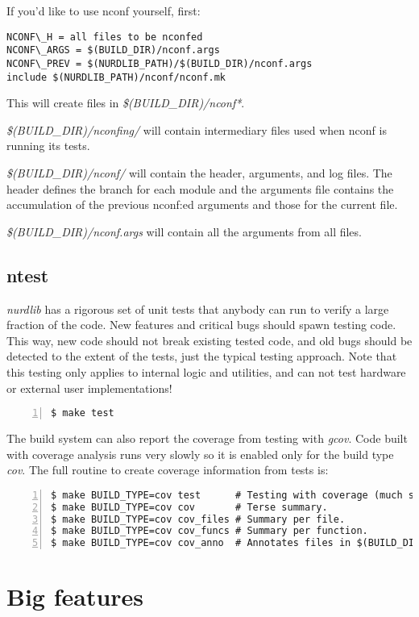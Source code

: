 \documentclass{article}
\begin{document}
If you'd like to use nconf yourself, first:
\begin{verbatim}
NCONF\_H = all files to be nconfed
NCONF\_ARGS = $(BUILD_DIR)/nconf.args
NCONF\_PREV = $(NURDLIB_PATH)/$(BUILD_DIR)/nconf.args
include $(NURDLIB_PATH)/nconf/nconf.mk
\end{verbatim}
This will create files in \emph{\$(BUILD\_DIR)/nconf*}.

\emph{\$(BUILD\_DIR)/nconfing/} will contain intermediary files used when
nconf is running its tests.

\emph{\$(BUILD\_DIR)/nconf/} will contain the header, arguments, and log
files. The header defines the branch for each module and the arguments file
contains the accumulation of the previous nconf:ed arguments and those for the
current file.

\emph{\$(BUILD\_DIR)/nconf.args} will contain all the arguments from all
files.



\subsection{ntest}

\emph{nurdlib} has a rigorous set of unit tests that anybody can run to verify
a large fraction of the code. New features and critical bugs should spawn
testing code. This way, new code should not break existing tested code, and
old bugs should be detected to the extent of the tests, just the typical
testing approach. Note that this testing only applies to internal logic and
utilities, and can not test hardware or external user implementations!
\begin{Verbatim}[frame=single,numbers=left]
$ make test
\end{Verbatim}
The build system can also report the coverage from testing with \emph{gcov}.
Code built with coverage analysis runs very slowly so it is enabled only for
the build type \emph{cov}. The full routine to create coverage information
from tests is:
\begin{Verbatim}[frame=single,numbers=left]
$ make BUILD_TYPE=cov test      # Testing with coverage (much slow!).
$ make BUILD_TYPE=cov cov       # Terse summary.
$ make BUILD_TYPE=cov cov_files # Summary per file.
$ make BUILD_TYPE=cov cov_funcs # Summary per function.
$ make BUILD_TYPE=cov cov_anno  # Annotates files in $(BUILD_DIR)/cov/.
\end{Verbatim}




\section{Big features}
\end{document}

